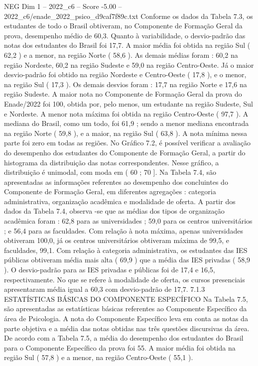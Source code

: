 \begin{textsample}{NEG Dim 1 – 2022\_c6 – Score -5.00 – 2022\_c6/enade\_2022\_psico\_d9caf7f89c.txt}
Conforme os dados da Tabela 7.3, os estudantes de todo o Brasil obtiveram, no Componente de Formação Geral da prova, desempenho médio de 60,3.
Quanto à variabilidade, o desvio-padrão das notas dos estudantes do Brasil foi 17,7.
A maior média foi obtida na região Sul ( 62,2 ) e a menor, na região Norte ( 58,6 ).
As demais médias foram : 60,2 na região Nordeste, 60,2 na região Sudeste e 59,0 na região Centro-Oeste.
Já o maior desvio-padrão foi obtido na região Nordeste e Centro-Oeste ( 17,8 ), e o menor, na região Sul ( 17,3 ).
Os demais desvios foram : 17,7 na região Norte e 17,6 na região Sudeste.
A maior nota no Componente de Formação Geral da prova do Enade/2022 foi 100, obtida por, pelo menos, um estudante na região Sudeste, Sul e Nordeste.
A menor nota máxima foi obtida na região Centro-Oeste ( 97,7 ).
A mediana do Brasil, como um todo, foi 61,9 ; sendo a menor mediana encontrada na região Norte ( 59,8 ), e a maior, na região Sul ( 63,8 ).
A nota mínima nessa parte foi zero em todas as regiões.
No Gráfico 7.2, é possível verificar a avaliação do desempenho dos estudantes do Componente de Formação Geral, a partir do histograma da distribuição das notas correspondentes.
Nesse gráfico, a distribuição é unimodal, com moda em ( 60 ; 70 ].
Na Tabela 7.4, são apresentadas as informações referentes ao desempenho dos concluintes do Componente de Formação Geral, em diferentes agregações : categoria administrativa, organização acadêmica e modalidade de oferta.
A partir dos dados da Tabela 7.4, observa -se que as médias dos tipos de organização acadêmica foram : 62,8 para as universidades ; 59,0 para os centros universitários ; e 56,4 para as faculdades.
Com relação à nota máxima, apenas universidades obtiveram 100,0, já os centros universitários obtiveram máxima de 99,5, e faculdades, 99,1.
Com relação à categoria administrativa, os estudantes das IES públicas obtiveram média mais alta ( 69,9 ) que a média das IES privadas ( 58,9 ).
O desvio-padrão para as IES privadas e públicas foi de 17,4 e 16,5, respectivamente.
No que se refere à modalidade de oferta, os cursos presenciais apresentaram média igual a 60,3 com desvio-padrão de 17,7. 7.1.3 ESTATÍSTICAS BÁSICAS DO COMPONENTE ESPECÍFICO Na Tabela 7.5, são apresentadas as estatísticas básicas referentes ao Componente Específico da área de Psicologia.
A nota do Componente Específico leva em conta as notas da parte objetiva e a média das notas obtidas nas três questões discursivas da área.
De acordo com a Tabela 7.5, a média do desempenho dos estudantes do Brasil para o Componente Específico da prova foi 55.
A maior média foi obtida na região Sul ( 57,8 ) e a menor, na região Centro-Oeste ( 55,1 ).

\end{textsample}
